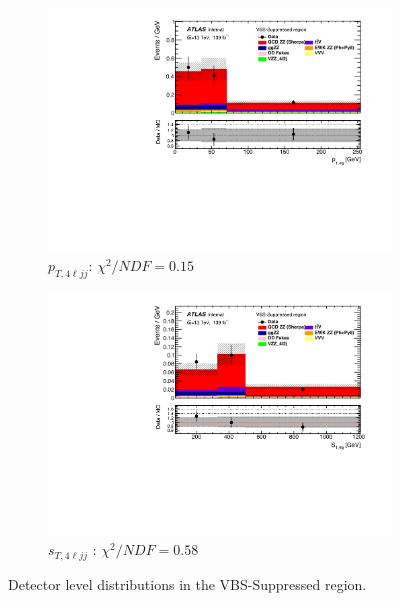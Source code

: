 \begin{figure}[!htb]
\begin{subfigure}{.49\textwidth}
        \includegraphics[width=.98\linewidth]{figures/Results/RecoDist_VBSSuppressed/reco_ptzzjj_CR.pdf}
        \caption{ \footnotesize{$p_{T,4\ell jj}$}: $\chi^2/NDF = 0.15$ }
    \end{subfigure}
    \begin{subfigure}{.49\textwidth}
        \centering
        \includegraphics[width=.98\linewidth]{figures/Results/RecoDist_VBSSuppressed/reco_stzzjj_CR.pdf}
        \caption{ \footnotesize{$s_{T, 4\ell jj}$ }: $\chi^2/NDF = 0.58$ }
    \end{subfigure}
    \caption{Detector level distributions in the VBS-Suppressed region.}  \label{fig:reco_VBS_Suppressed_a}
\end{figure}


